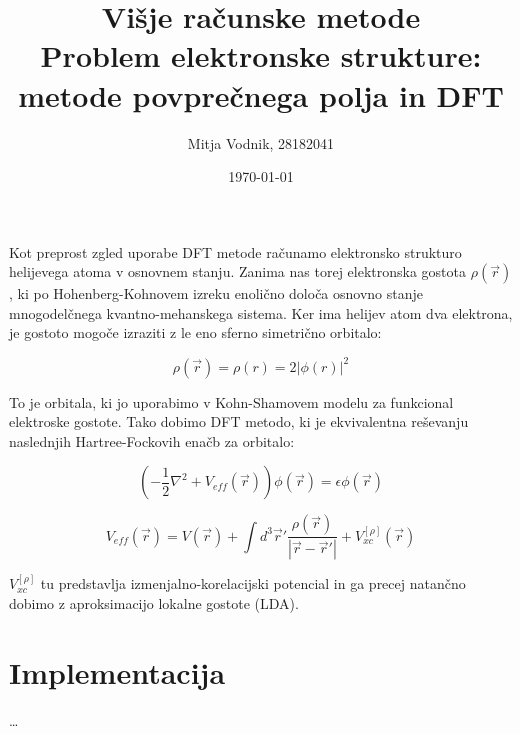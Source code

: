 \documentclass[a4paper]{article}
\newcommand{\half}{\frac{1}{2}}
\newcommand{\vr}{\vec{r}}
\begin{document}
    \title{\sc\large Višje računske metode\\
		\bigskip
		\bf\Large Problem elektronske strukture: metode povprečnega polja in DFT}
	\author{Mitja Vodnik, 28182041}
            \date{\today}
	\maketitle

    Kot preprost zgled uporabe DFT metode računamo elektronsko strukturo helijevega atoma v osnovnem stanju.
    Zanima nas torej elektronska gostota $\rho(\vr)$, ki po Hohenberg-Kohnovem izreku enolično določa osnovno
    stanje mnogodelčnega kvantno-mehanskega sistema.
    Ker ima helijev atom dva elektrona, je gostoto mogoče izraziti z le eno sferno simetrično orbitalo:

    \begin{equation}\label{eq1}
        \rho(\vr) = \rho(r) = 2|\phi(r)|^2
    \end{equation}

    To je orbitala, ki jo uporabimo v Kohn-Shamovem modelu za funkcional elektroske gostote.
    Tako dobimo DFT metodo, ki je ekvivalentna reševanju naslednjih Hartree-Fockovih enačb za orbitalo:

    \begin{equation}\label{eq2}
        \left( -\half \nabla^2 + V_{eff}(\vr) \right) \phi(\vr) = \epsilon \phi(\vr)
    \end{equation}

    \begin{equation}\label{eq3}
        V_{eff}(\vr) = V(\vr) + \int d^3\vr' \frac{\rho(\vr)}{|\vr - \vr'|} + V_{xc}^{[\rho]}(\vr)
    \end{equation}

    $V_{xc}^{[\rho]}$ tu predstavlja izmenjalno-korelacijski potencial in ga precej natančno dobimo z aproksimacijo
    lokalne gostote (LDA).

    \section{Implementacija}

    \ldots

    \iffalse
    \begin{figure}
        \centering
        \texttt{[image: slika1.pdf]}
        \caption{Energije verige preračunane na delec. Najnižja vrednost, do katere pridemo na grafu je $E_0/n \approx -1.767$}
        \label{slika1}
    \end{figure}

    \begin{figure}
        \centering
        \begin{subfigure}{\textwidth}
            \texttt{[image: slika3a.pdf]}
        \end{subfigure}
        \begin{subfigure}{\textwidth}
            \texttt{[image: slika3b.pdf]}
        \end{subfigure}
        \caption{Prikaza matrik spinskih korelacij v osnovnem stanju dveh različno dolgih verig.}
        \label{slika3}
    \end{figure}
    \fi
\end{document}
